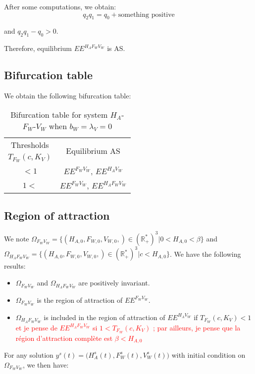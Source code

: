 \documentclass{article}
\newcommand{\lvw}{\lambda_{V}}
\newcommand{\marc}[1]{\textcolor{red}{#1}}
\begin{document}
\begin{itemize}
After some computations, we obtain:
$$
q_2 q_1 = q_0 + \text{something positive}
$$

and $q_2 q_1 - q_0 > 0$.

Therefore, equilibrium $EE^{H_AF_WV_W}$ is AS.
\end{itemize}

\subsection{Bifurcation table}
We obtain the following bifurcation table:
\begin{table}[!ht]
\centering
\caption{Bifurcation table for system $H_A$- $F_W$-$V_W$ when $b_W = \lvw = 0$}
\label{anthropicWildHAFWVW:bifurcationTable}
\begin{tabular}{c|c}
Thresholds & \multirow{2}{*}{Equilibrium AS}\\
$T_{F_W}(c, K_V)$  &\\
 \hline
$<1$ & $EE^{F_WV_W}$, $EE^{H_AV_W}$\\
\hline
$1 < $ & $EE^{F_WV_W}$, $EE^{H_AF_WV_W}$
\end{tabular}
\end{table}


\subsection{Region of attraction}
We note $\Omega_{F_WV_W} = \Big\{(H_{A, 0}, F_{W,0}, V_{W, 0},) \in (\mathbb{R}_+^*)^3 | 0 < H_{A, 0} < \beta\Big\}$ and $\Omega_{H_AF_WV_W} = \Big\{(H_{A, 0}, F_{W,0}, V_{W, 0},) \in (\mathbb{R}_+^*)^3 | c < H_{A, 0} \Big\}$. We have the following results:
\begin{itemize}
\item $\Omega_{F_WV_W}$ and $\Omega_{H_AF_WV_W}$ are positively invariant.
\item $\Omega_{F_WV_W}$ is the region of attraction of $EE^{F_WV_W}$.
\item $\Omega_{H_AF_WV_W}$ is included in the region of attraction of $EE^{H_AV_W}$ if $T_{F_W}(c, K_V) < 1$ \marc{et je pense de $EE^{H_AF_WV_W}$ si $1 < T_{F_W}(c, K_V)$ ; par ailleurs, je pense que la région d'attraction complète est $ \beta < H_{A, 0}$}
\end{itemize}

For any solution $y^s(t) = \Big(H_A^s(t), F_W^s(t), V_W^s(t)\Big)$ with initial condition on $\Omega_{F_WV_W}$, we then have:
\end{document}

